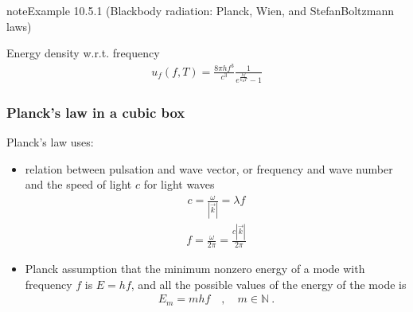 \documentclass[letterpaper,10pt,english]{jupyterBook}
\begin{document}
\begin{sphinxadmonition}{note}{Example 10.5.1 (Black\sphinxhyphen{}body radiation: Planck, Wien, and Stefan\sphinxhyphen{}Boltzmann laws)}



\sphinxAtStartPar
{} Energy density w.r.t. frequency
\begin{equation*}
\begin{split}u_{f}(f, T) = \frac{8 \pi h f^3}{c^3} \frac{1}{e^{\frac{hf}{k_B T}} - 1}\end{split}
\end{equation*}\subsubsection*{Planck’s law in a cubic box}

\sphinxAtStartPar
Planck’s law uses:
\begin{itemize}
\item {} 
\sphinxAtStartPar
relation between pulsation and wave vector, or frequency and wave number and the speed of light \(c\) for light waves
\begin{equation*}
\begin{split}c = \frac{\omega}{|\vec{k}|} = \lambda f\end{split}
\end{equation*}\begin{equation*}
\begin{split}f = \frac{\omega}{2\pi} = \frac{c |\vec{k}|}{2 \pi}\end{split}
\end{equation*}
\item {} 
\sphinxAtStartPar
Planck assumption that the minimum non\sphinxhyphen{}zero energy of a mode with frequency \(f\) is \(E = h f\), and all the possible values of the energy of the mode is
\begin{equation*}
\begin{split}E_m = m h f \quad , \quad m \in \mathbb{N} \ .\end{split}
\end{equation*}
\end{itemize}


\end{sphinxadmonition}
\end{document}
